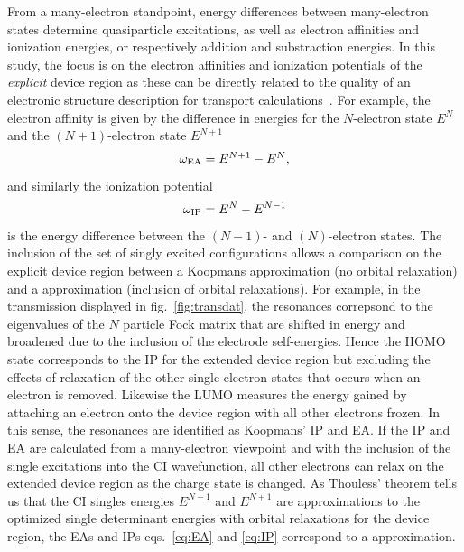 From a many-electron standpoint, energy differences between many-electron
states determine quasiparticle excitations, as well as electron affinities
and ionization energies, or respectively addition and substraction energies. 
In this study, the focus is on the electron affinities and ionization
potentials of the {\it explicit} device region as these can be directly
related to the quality of an electronic structure description for transport
calculations~\cite{golden}. For example, the electron affinity is given
by the difference in energies for the $N$-electron state $E^N$ and the
$(N+1)$-electron state $E^{N+1}$
\begin{equation}
\label{eq:EA}
\omega_{\rm EA} = E^{N+1} -E^N,
\end{equation}
and similarly the ionization potential
\begin{equation}
\label{eq:IP}
\omega_{\rm IP} =  E^N - E^{N-1}
\end{equation}
is the energy difference between the $(N-1)$- and $(N)$-electron states.
The inclusion of the set of singly excited configurations allows a
comparison on the explicit device region between a Koopmans approximation 
(no orbital relaxation) and a \dscf approximation (inclusion of
orbital relaxations).  For example, in the transmission displayed in
fig.~\ref{fig:transdat}, the resonances correpsond to the eigenvalues of
the $N$ particle Fock matrix that are shifted in energy and broadened due
to the inclusion of the electrode self-energies. Hence the \ac{HOMO} state
corresponds to the IP for the extended device region but excluding the
effects of relaxation of the other single electron states that occurs
when an electron is removed. Likewise the LUMO measures the energy gained
by attaching an electron onto the device region with all other electrons
frozen. In this sense, the resonances are identified as Koopmans' IP and
EA. If the IP and EA are calculated from a many-electron viewpoint and
with the inclusion of the single excitations into the CI wavefunction,
all other electrons can relax on the extended device region as the charge
state is changed. As Thouless' theorem tells us that the CI singles
energies $E^{N-1}$ and $E^{N+1}$ are approximations to the optimized
single determinant energies with orbital relaxations for the device region,
the EAs and IPs eqs.~\ref{eq:EA} and \ref{eq:IP} correspond to a \dscf
approximation. 

